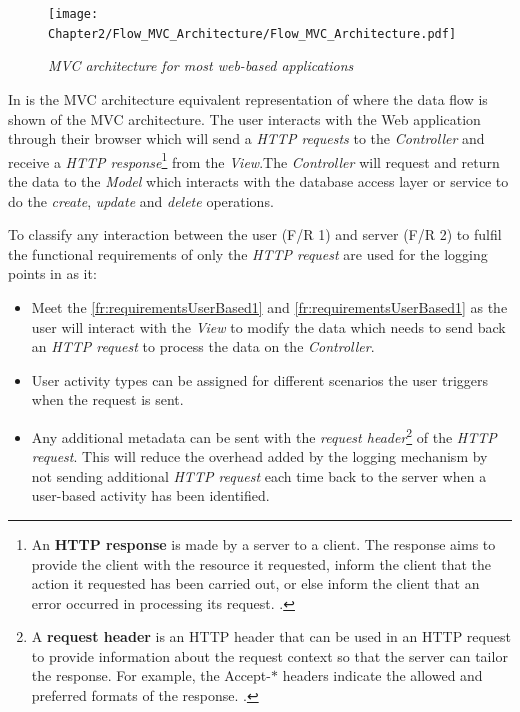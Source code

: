 \begin{figure}[!htb]
	\centering %
	\texttt{[image: Chapter2/Flow\_MVC\_Architecture/Flow\_MVC\_Architecture.pdf]}
	\caption[MVC architecture for most web-based applications]
	{\textit{MVC architecture for most web-based applications \cite{Gu2010}}}\label{fig:ch2_flowMVC_Architecture}
\end{figure}

In  is the MVC architecture equivalent representation of  where the data flow is shown of the MVC architecture. The user interacts with the Web application through their browser which will send a \textit{HTTP requests} to the \textit{Controller} and receive a \textit{HTTP response}\footnote{An \textbf{HTTP response} is made by a server to a client. The response aims to provide the client with the resource it requested, inform the client that the action it requested has been carried out, or else inform the client that an error occurred in processing its request. \cite{IBM2021a}.} from the \textit{View}.The \textit{Controller} will request and return the data to the \textit{Model} which interacts with the database access layer or service to do the \textit{create}, \textit{update} and \textit{delete} operations.\par To classify any interaction between the user (F/R 1) and server (F/R 2) to fulfil the functional requirements of  only the \textit{HTTP request} are used for the logging points in  as it:

\begin{itemize}
	\item Meet the \ref{fr:requirementsUserBased1} and \ref{fr:requirementsUserBased1} as the user will interact with the \textit{View} to modify the data which needs to send back an \textit{HTTP request} to process the data on the \textit{Controller}.
	\item User activity types can be assigned for different scenarios the user triggers when the request is sent. 
	\item Any additional metadata can be sent with the \textit{request header}\footnote{A \textbf{request header} is an HTTP header that can be used in an HTTP request to provide information about the request context so that the server can tailor the response. For example, the Accept-$\ast$ headers indicate the allowed and preferred formats of the response. \cite{Mozilla2022}.} of the \textit{HTTP request}. This will reduce the overhead added by the logging mechanism by not sending additional \textit{HTTP request} each time back to the server when a user-based activity has been identified.
\end{itemize}

